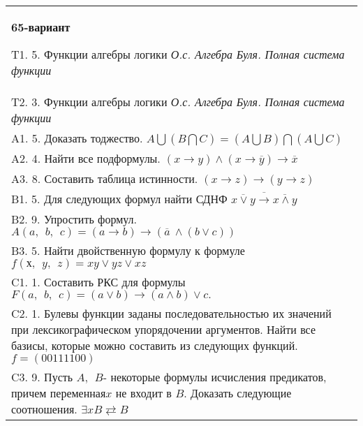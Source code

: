 \documentclass{article}
\begin{document}
\begin{tabular}{m{17cm}}
\textbf{65-вариант}
\newline

T1. 5. Функции алгебры логики \emph{О.с. Алгебра Буля. Полная система функции} \\
T2. 3. Функции алгебры логики \emph{О.с. Алгебра Буля. Полная система функции} \\
A1. 5. Доказать тоджество. \(A\bigcup(B\bigcap C) = (A\bigcup B)\bigcap(A\bigcup C)\) \\
A2. 4. Найти все подформулы. \((x \rightarrow y) \land (x \rightarrow \overline{y}) \rightarrow \overline{x}\) \\
A3. 8. Составить таблица истинности. \((x \rightarrow z) \rightarrow (y \rightarrow z)\) \\
B1. 5. Для следующих формул найти СДНФ \(\overline{\overline{x \vee y} \rightarrow \overline{x \land y}}\) \\
B2. 9. Упростить формул. \(A(a,\ \ b,\ \ c) = (a \rightarrow b) \rightarrow (\overline{a}\  \land (b \vee c))\) \\
B3. 5. Найти двойственную формулу к формуле \(f(х,\ \ y,\ \ z) = xy \vee yz \vee xz\) \\
C1. 1. Составить РКС для формулы \(F(a,\ \ b,\ \ c) = (a \vee b) \rightarrow (a \land b) \vee c.\) \\
C2. 1. Булевы функции заданы последовательностью их значений при лексикографическом упорядочении аргументов. Найти все базисы, которые можно составить из следующих функций.\(f = (00111100)\) \\
C3. 9. Пусть \(A,\ \ B\)- некоторые формулы исчисления предикатов, причем переменная\(x\) не входит в \(B\). Доказать следующие соотношения. \(\exists xB \rightleftarrows B\)
 \\

\end{tabular}
\vspace{1cm}
\end{document}
